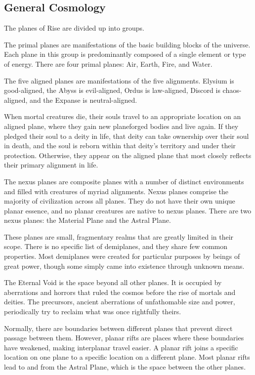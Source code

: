   \subsection{General Cosmology}
    The planes of Rise are divided up into groups.

     The primal planes are manifestations of the basic building blocks of the universe.
    Each plane in this group is predominantly composed of a single element or type of energy.
    There are four primal planes: Air, Earth, Fire, and Water.

     The five aligned planes are manifestations of the five alignments.
    Elysium is good-aligned, the Abyss is evil-aligned, Ordus is law-aligned, Discord is chaos-aligned, and the Expanse is neutral-aligned.

    When mortal creatures die, their souls travel to an appropriate location on an aligned plane, where they gain new planeforged bodies and live again.
    If they pledged their soul to a deity in life, that deity can take ownership over their soul in death, and the soul is reborn within that deity's territory and under their protection.
    Otherwise, they appear on the aligned plane that most closely reflects their primary alignment in life.

     The nexus planes are composite planes with a number of distinct environments and filled with creatures of myriad alignments.
    Nexus planes comprise the majority of civilization across all planes.
    They do not have their own unique planar essence, and no planar creatures are native to nexus planes.
    There are two nexus planes: the Material Plane and the Astral Plane.

     These planes are small, fragmentary realms that are greatly limited in their scope.
    There is no specific list of demiplanes, and they share few common properties.
    Most demiplanes were created for particular purposes by beings of great power, though some simply came into existence through unknown means.

     The Eternal Void is the space beyond all other planes.
    It is occupied by aberrations and horrors that ruled the cosmos before the rise of mortals and deities.
    The precursors, ancient aberrations of unfathomable size and power, periodically try to reclaim what was once rightfully theirs.

  \label{Planar Rifts}
    Normally, there are boundaries between different planes that prevent direct passage between them.
    However, planar rifts are places where these boundaries have weakened, making interplanar travel easier.
    A planar rift joins a specific location on one plane to a specific location on a different plane.
    Most planar rifts lead to and from the Astral Plane, which is the space between the other planes.

